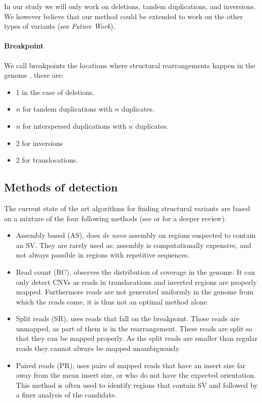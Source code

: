\documentclass{article}
\begin{document}
In our study we will only work on deletions, tandem duplications, and inversions. We however believe that our method could be extended to work on the other types of variants (see \emph{Future Work}).

\paragraph{Breakpoint} We call breakpoints the locations where structural rearrangements happen in the genome , there are:
\begin{itemize}
    \item 1 in the case of deletions.
    \item $n$ for tandem duplications with $n$ duplicates.
    \item $n$ for interspersed duplications with $n$ duplicates.
    \item 2 for inversions
    \item 2 for translocations.
\end{itemize}

\subsection{Methods of detection}

The current state of the art algorithms for finding structural variants are based on a mixture of the four following methods (see \cite{lin_making_2015} or \cite{sudmant_integrated_2015} for a deeper review):

\begin{itemize}
	\item Assembly based (AS), does \emph{de novo} assembly on regions suspected to contain an SV. They are rarely used as: assembly is computationally expensive, and not always possible in regions with repetitive sequences.
	\item Read count (RC), observes the distribution of coverage in the genome. It can only detect CNVs as reads in translocations and inverted regions are properly mapped. Furthermore reads are not generated uniformly in the genome from which the reads come, it is thus not an optimal method alone.
	\item Split reads (SR), uses reads that fall on the breakpoint. Those reads are unmapped, as part of them is in the rearrangement. These reads are split so that they can be mapped properly. As the split reads are smaller than regular reads they cannot always be mapped unambiguously.
	\item Paired reads (PR), uses pairs of mapped reads that have an insert size far away from the mean insert size, or who do not have the expected orientation. This method is often used to identify regions that contain SV and followed by a finer analysis of the candidate.
\end{itemize}
\end{document}
